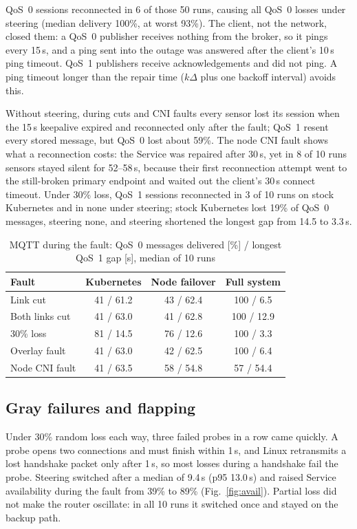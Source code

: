 \documentclass[conference,compsoc]{IEEEtran}
\begin{document}
QoS~0 sessions reconnected in 6 of those 50 runs, causing all QoS~0 losses under
steering (median delivery 100\%, at worst 93\%). The client, not the network, closed
them: a QoS~0 publisher receives nothing from the broker, so it pings every 15\,s, and
a ping sent into the outage was answered after the client's 10\,s ping timeout. QoS~1
publishers receive acknowledgements and did not ping. A ping timeout longer than the
repair time ($k\Delta$ plus one backoff interval) avoids this.

Without steering, during cuts and CNI faults every sensor lost its session when the
15\,s keepalive expired and reconnected only after the fault; QoS~1 resent every stored
message, but QoS~0 lost about 59\%. The node CNI fault shows what a reconnection costs:
the Service was repaired after 30\,s, yet in 8 of 10 runs sensors stayed silent for
52--58\,s, because their first reconnection attempt went to the still-broken primary
endpoint and waited out the client's 30\,s connect timeout. Under 30\% loss, QoS~1
sessions reconnected in 3 of 10 runs on stock Kubernetes and in none under steering;
stock Kubernetes lost 19\% of QoS~0 messages, steering none, and steering shortened the
longest gap from 14.5 to 3.3\,s.

\begin{table}[t]
\centering
\caption{MQTT during the fault: QoS~0 messages delivered [\%] / longest QoS~1 gap
[s], median of 10 runs}
\label{tab:mqtt}
\footnotesize
\setlength{\tabcolsep}{4pt}
\begin{tabular}{@{}lccc@{}}
\toprule
Fault & Kubernetes & Node failover & Full system \\
\midrule
Link cut        & 41 / 61.2 & 43 / 62.4 & 100 / 6.5 \\
Both links cut  & 41 / 63.0 & 41 / 62.8 & 100 / 12.9 \\
30\% loss       & 81 / 14.5 & 76 / 12.6 & 100 / 3.3 \\
Overlay fault   & 41 / 63.0 & 42 / 62.5 & 100 / 6.4 \\
Node CNI fault  & 41 / 63.5 & 58 / 54.8 & 57 / 54.4 \\
\bottomrule
\end{tabular}
\end{table}

\subsection{Gray failures and flapping}
Under 30\% random loss each way, three failed probes in a row came quickly. A probe
opens two connections and must finish within 1\,s, and Linux retransmits a lost
handshake packet only after 1\,s, so most losses during a handshake fail the probe. Steering switched after a median of 9.4\,s (p95 13.0\,s) and raised Service
availability during the fault from 39\% to 89\% (Fig.~\ref{fig:avail}). Partial loss
did not make the router oscillate: in all 10 runs it switched once and stayed on the
backup path.
\end{document}

